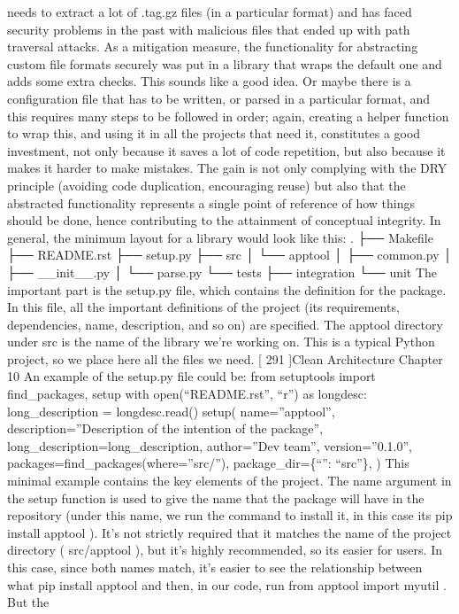 \documentclass[a4paper,10pt,english]{sphinxmanual}
\begin{document}
needs to extract a lot of .tag.gz files (in a particular format) and has faced security
problems in the past with malicious files that ended up with path traversal attacks. As a
mitigation measure, the functionality for abstracting custom file formats securely was put
in a library that wraps the default one and adds some extra checks. This sounds like a good
idea.
Or maybe there is a configuration file that has to be written, or parsed in a particular
format, and this requires many steps to be followed in order; again, creating a helper
function to wrap this, and using it in all the projects that need it, constitutes a good
investment, not only because it saves a lot of code repetition, but also because it makes it
harder to make mistakes.
The gain is not only complying with the DRY principle (avoiding code duplication,
encouraging reuse) but also that the abstracted functionality represents a single point of
reference of how things should be done, hence contributing to the attainment of conceptual
integrity.
In general, the minimum layout for a library would look like this:
.
├── Makefile
├── README.rst
├── setup.py
├── src
│
└── apptool
│
├── common.py
│
├── \_\_init\_\_.py
│
└── parse.py
└── tests
├── integration
└── unit
The important part is the setup.py file, which contains the definition for the package. In
this file, all the important definitions of the project (its requirements, dependencies, name,
description, and so on) are specified.
The apptool directory under src is the name of the library we’re working on. This is a
typical Python project, so we place here all the files we need.
{[} 291 {]}Clean Architecture
Chapter 10
An example of the setup.py file could be:
from setuptools import find\_packages, setup
with open(“README.rst”, “r”) as longdesc:
long\_description = longdesc.read()
setup(
name=”apptool”,
description=”Description of the intention of the package”,
long\_description=long\_description,
author=”Dev team”,
version=”0.1.0”,
packages=find\_packages(where=”src/”),
package\_dir=\{“”: “src”\},
)
This minimal example contains the key elements of the project. The name argument in the
setup function is used to give the name that the package will have in the repository (under
this name, we run the command to install it, in this case its pip install apptool ). It’s
not strictly required that it matches the name of the project directory ( src/apptool ), but
it’s highly recommended, so its easier for users.
In this case, since both names match, it’s easier to see the relationship between what pip
install apptool and then, in our code, run from apptool import myutil . But the
\end{document}

